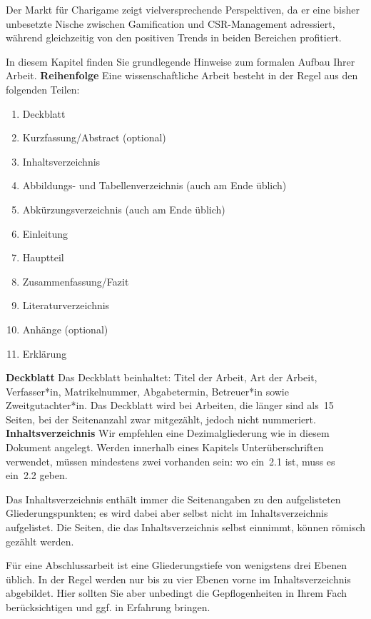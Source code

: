 Der Markt für Charigame zeigt vielversprechende Perspektiven, da er eine bisher unbesetzte Nische zwischen Gamification und CSR-Management adressiert, während gleichzeitig von den positiven Trends in beiden Bereichen profitiert.


\label{chap:formal}
%
In diesem Kapitel finden Sie grundlegende Hinweise zum formalen Aufbau Ihrer Arbeit.
%
\textbf{Reihenfolge}
\label{sec:aufbau}
Eine wissenschaftliche Arbeit besteht in der Regel aus den folgenden Teilen:
%
\begin{enumerate}
 \item Deckblatt
 \item Kurzfassung/Abstract (optional)
 \item Inhaltsverzeichnis
 \item Abbildungs- und Tabellenverzeichnis (auch am Ende üblich)
 \item Abkürzungsverzeichnis (auch am Ende üblich)
 \item Einleitung
 \item Hauptteil
 \item Zusammenfassung/Fazit
 \item Literaturverzeichnis
 \item Anhänge (optional)
 \item Erklärung
\end{enumerate}
%
%
\textbf{Deckblatt}
Das Deckblatt beinhaltet: Titel der Arbeit, Art der Arbeit, Verfasser*in, Matrikelnummer, Abgabetermin, Betreuer*in sowie Zweitgutachter*in. Das Deckblatt wird bei Arbeiten, die länger sind als~15 Seiten, bei der Seitenanzahl zwar mitgezählt, jedoch nicht nummeriert.
%
%
\textbf{Inhaltsverzeichnis}
\label{sec:listOfContents}
Wir empfehlen eine Dezimalgliederung wie in diesem Dokument angelegt. Werden innerhalb eines Kapitels Unterüberschriften verwendet, müssen mindestens zwei vorhanden sein: wo ein~2.1 ist, muss es ein~2.2 geben.
\par
Das Inhaltsverzeichnis enthält immer die Seitenangaben zu den aufgelisteten Gliederungspunkten; es wird dabei aber selbst nicht im Inhaltsverzeichnis aufgelistet. Die Seiten, die das Inhaltsverzeichnis selbst einnimmt, können römisch gezählt werden.
\par
Für eine Abschlussarbeit ist eine Gliederungstiefe von wenigstens drei Ebenen üblich. In der Regel werden nur bis zu vier Ebenen vorne im Inhaltsverzeichnis abgebildet. Hier sollten Sie aber unbedingt die Gepflogenheiten in Ihrem Fach berücksichtigen und ggf. in Erfahrung bringen.
